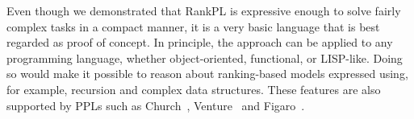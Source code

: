 \documentclass{llncs}
\begin{document}
Even though we demonstrated that RankPL is expressive enough to solve 
	fairly complex tasks in a compact manner, it is a very basic language that is best regarded as proof of concept.
In principle, the approach can be applied to any programming language,
	whether object-oriented, functional, or LISP-like.
Doing so would make it possible to reason about ranking-based models expressed using, for example, recursion and complex data structures.
These features are also supported by PPLs such as Church~\cite{DBLP:conf/uai/GoodmanMRBT08}, 
	Venture~\cite{DBLP:journals/corr/MansinghkaSP14} and Figaro~\cite{pfeffer2009figaro}. 
	







\end{document}
